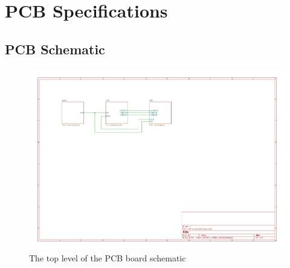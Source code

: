 \chapter{PCB Specifications} %

\label{AppendixA} %

\section{PCB Schematic}

\begin{figure}[h]
  \centering
  \includegraphics[height=.8\textwidth,angle=90,page=1]{Figures/kicad/lathrum_thesis_schematic.pdf}
  \captionsetup{width=1\linewidth}
  \caption[Top Level Schematic]{The top level of the PCB board schematic}
  \label{app:pcb_schematic_top}
\end{figure}

